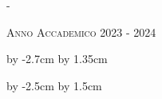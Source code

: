 \begin{titlingpage}
\begin{adjustwidth*}{\unitlength}{-\unitlength}
\begin{center}
\begin{center}
\end{center}




\vspace{3.75cm}


\textsc{Anno Accademico 2023 - 2024}\\[0.2cm]


\end{center}

\end{adjustwidth*}


\advance\hsize by -2.7cm %
\advance\hoffset by 1.35cm %


\end{titlingpage}


\advance\vsize by -2.5cm %
\advance\voffset by 1.5cm %






